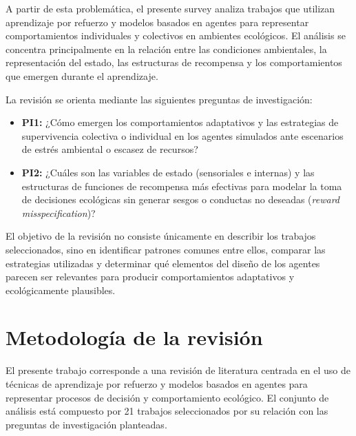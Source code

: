 \documentclass[conference]{IEEEtran}
\begin{document}
A partir de esta problemática, el presente survey analiza trabajos que
utilizan aprendizaje por refuerzo y modelos basados en agentes para
representar comportamientos individuales y colectivos en ambientes
ecológicos. El análisis se concentra principalmente en la relación entre
las condiciones ambientales, la representación del estado, las
estructuras de recompensa y los comportamientos que emergen durante el
aprendizaje.

La revisión se orienta mediante las siguientes preguntas de
investigación:

\begin{itemize}

    \item \textbf{PI1:} ¿Cómo emergen los comportamientos adaptativos y
    las estrategias de supervivencia colectiva o individual en los
    agentes simulados ante escenarios de estrés ambiental o escasez de
    recursos?

    \item \textbf{PI2:} ¿Cuáles son las variables de estado
    (sensoriales e internas) y las estructuras de funciones de recompensa
    más efectivas para modelar la toma de decisiones ecológicas sin
    generar sesgos o conductas no deseadas
    (\textit{reward misspecification})?

\end{itemize}

El objetivo de la revisión no consiste únicamente en describir los
trabajos seleccionados, sino en identificar patrones comunes entre ellos,
comparar las estrategias utilizadas y determinar qué elementos del diseño
de los agentes parecen ser relevantes para producir comportamientos
adaptativos y ecológicamente plausibles.


\section{Metodología de la revisión}

El presente trabajo corresponde a una revisión de literatura centrada en
el uso de técnicas de aprendizaje por refuerzo y modelos basados en
agentes para representar procesos de decisión y comportamiento ecológico.
El conjunto de análisis está compuesto por 21 trabajos seleccionados por
su relación con las preguntas de investigación planteadas.
\end{document}
